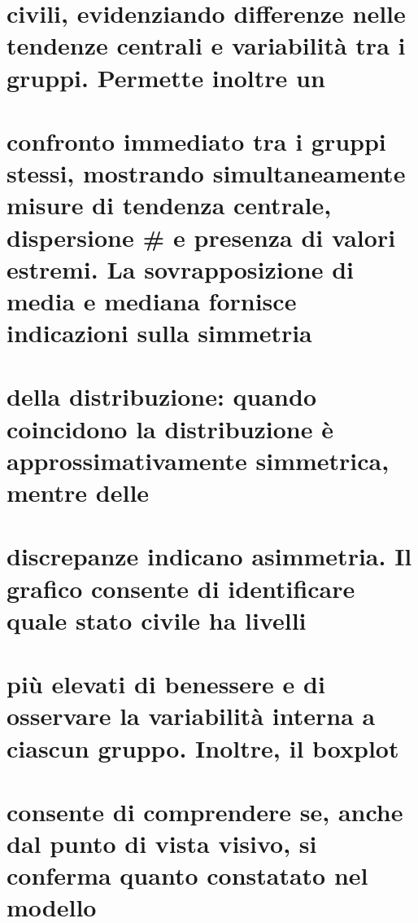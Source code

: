 \documentclass[
]{article}
\begin{document}
\section{civili, evidenziando differenze nelle tendenze centrali e
variabilità tra i gruppi. Permette inoltre
un}\label{civili-evidenziando-differenze-nelle-tendenze-centrali-e-variabilituxe0-tra-i-gruppi.-permette-inoltre-un}

\section{confronto immediato tra i gruppi stessi, mostrando
simultaneamente misure di tendenza centrale, dispersione \# e presenza
di valori estremi. La sovrapposizione di media e mediana fornisce
indicazioni sulla
simmetria}\label{confronto-immediato-tra-i-gruppi-stessi-mostrando-simultaneamente-misure-di-tendenza-centrale-dispersione-e-presenza-di-valori-estremi.-la-sovrapposizione-di-media-e-mediana-fornisce-indicazioni-sulla-simmetria}

\section{della distribuzione: quando coincidono la distribuzione è
approssimativamente simmetrica, mentre
delle}\label{della-distribuzione-quando-coincidono-la-distribuzione-uxe8-approssimativamente-simmetrica-mentre-delle}

\section{discrepanze indicano asimmetria. Il grafico consente di
identificare quale stato civile ha
livelli}\label{discrepanze-indicano-asimmetria.-il-grafico-consente-di-identificare-quale-stato-civile-ha-livelli}

\section{più elevati di benessere e di osservare la variabilità interna
a ciascun gruppo. Inoltre, il
boxplot}\label{piuxf9-elevati-di-benessere-e-di-osservare-la-variabilituxe0-interna-a-ciascun-gruppo.-inoltre-il-boxplot}

\section{consente di comprendere se, anche dal punto di vista visivo, si
conferma quanto constatato nel
modello}\label{consente-di-comprendere-se-anche-dal-punto-di-vista-visivo-si-conferma-quanto-constatato-nel-modello}
\end{document}
